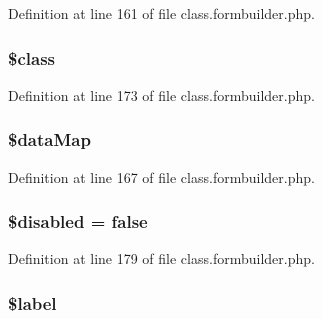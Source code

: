 Definition at line 161 of file class.\-formbuilder.\-php.

\hypertarget{class_form_builder_field_a252ba022809910ea710a068fc1bab657}{
\subsubsection[{\$class}]{\setlength{\rightskip}{0pt plus 5cm}\$class}}\label{class_form_builder_field_a252ba022809910ea710a068fc1bab657}


Definition at line 173 of file class.\-formbuilder.\-php.

\hypertarget{class_form_builder_field_ab8eee52ae0aef5e6e6392d6f3365962c}{
\subsubsection[{\$data\-Map}]{\setlength{\rightskip}{0pt plus 5cm}\$data\-Map}}\label{class_form_builder_field_ab8eee52ae0aef5e6e6392d6f3365962c}


Definition at line 167 of file class.\-formbuilder.\-php.

\hypertarget{class_form_builder_field_a6c108f5b26242d862f6e51869fbfd271}{
\subsubsection[{\$disabled}]{\setlength{\rightskip}{0pt plus 5cm}\$disabled = false}}\label{class_form_builder_field_a6c108f5b26242d862f6e51869fbfd271}


Definition at line 179 of file class.\-formbuilder.\-php.

\hypertarget{class_form_builder_field_a177af2bf70bede02de3d05a425fb8e43}{
\subsubsection[{\$label}]{\setlength{\rightskip}{0pt plus 5cm}\$label}}\label{class_form_builder_field_a177af2bf70bede02de3d05a425fb8e43}


